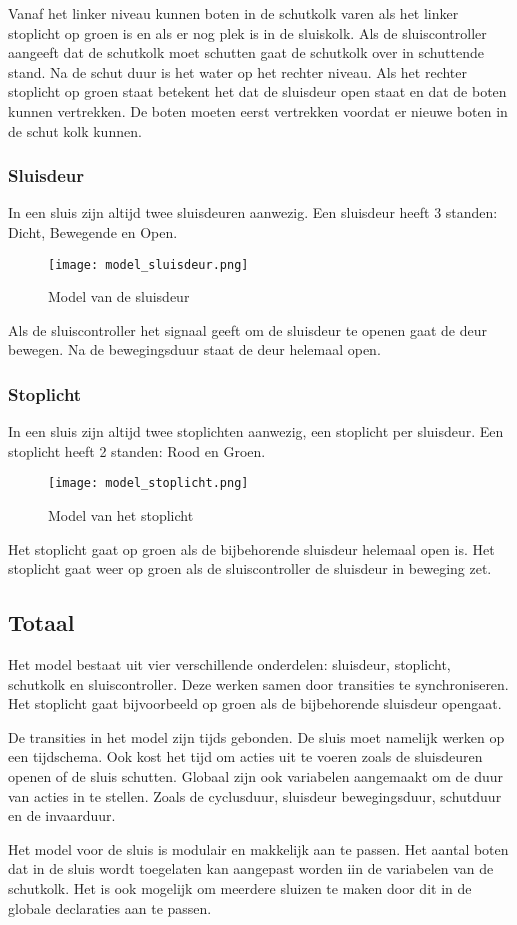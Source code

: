 \documentclass[../verslag.tex]{subfiles}
\begin{document}
Vanaf het linker niveau kunnen boten in de schutkolk varen als het linker stoplicht op groen is en als er nog plek is in de sluiskolk. Als de sluiscontroller aangeeft dat de schutkolk moet schutten gaat de schutkolk over in schuttende stand. Na de schut duur is het water op het rechter niveau. Als het rechter stoplicht op groen staat betekent het dat de sluisdeur open staat en dat de boten kunnen vertrekken. De boten moeten eerst vertrekken voordat er nieuwe boten in de schut kolk kunnen.





\subsubsection{Sluisdeur}
In een sluis zijn altijd twee sluisdeuren aanwezig.
Een sluisdeur heeft 3 standen: Dicht, Bewegende en Open.
\begin{figure}[H]
    \centering
    \texttt{[image: model\_sluisdeur.png]}
    \caption{Model van de sluisdeur}
\end{figure}

Als de sluiscontroller het signaal geeft om de sluisdeur te openen gaat de deur bewegen. Na de bewegingsduur staat de deur helemaal open.




\subsubsection{Stoplicht}
In een sluis zijn altijd twee stoplichten aanwezig, een stoplicht per sluisdeur.
Een stoplicht heeft 2 standen: Rood en Groen.
\begin{figure}[H]
    \centering
    \texttt{[image: model\_stoplicht.png]}
    \caption{Model van het stoplicht}
\end{figure}

Het stoplicht gaat op groen als de bijbehorende sluisdeur helemaal open is. Het stoplicht gaat weer op groen als de sluiscontroller de sluisdeur in beweging zet.





\subsection{Totaal}

Het model bestaat uit vier verschillende onderdelen: sluisdeur, stoplicht, schutkolk en sluiscontroller. Deze werken samen door transities te synchroniseren. Het stoplicht gaat bijvoorbeeld op groen als de bijbehorende sluisdeur opengaat.

De transities in het model zijn tijds gebonden. De sluis moet namelijk werken op een tijdschema. Ook kost het tijd om acties uit te voeren zoals de sluisdeuren openen of de sluis schutten. Globaal zijn ook variabelen aangemaakt om de duur van acties in te stellen. Zoals de cyclusduur, sluisdeur bewegingsduur, schutduur en de invaarduur.

Het model voor de sluis is modulair en makkelijk aan te passen. Het aantal boten dat in de sluis wordt toegelaten kan aangepast worden iin de variabelen van de schutkolk. Het is ook mogelijk om meerdere sluizen te maken door dit in de globale declaraties aan te passen.
\end{document}
